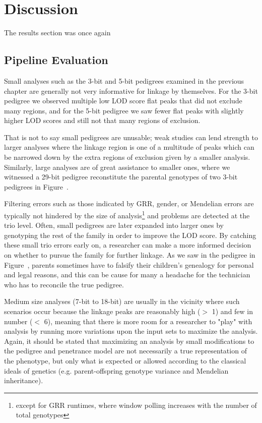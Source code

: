 \chapter{Discussion}

The results section was once again

\section{Pipeline Evaluation}

Small analyses such as the 3-bit and 5-bit pedigrees examined in the previous chapter are generally not very informative for linkage by themselves. For the 3-bit pedigree we observed multiple low LOD score flat peaks that did not exclude many regions, and for the 5-bit pedigree we saw fewer flat peaks with slightly higher LOD scores and still not that many regions of exclusion.

That is not to say small pedigrees are unusable; weak studies can lend strength to larger analyses where the linkage region is one of a multitude of peaks which can be narrowed down by the extra regions of exclusion given by a smaller analysis. Similarly, large analyses are of great assistance to smaller ones, where we witnessed a 29-bit pedigree reconstitute the parental genotypes of two 3-bit pedigrees in Figure~.

Filtering errors such as those indicated by GRR, gender, or Mendelian errors are typically not hindered by the size of analysis\footnote{except for GRR runtimes, where window polling increases with the number of total genotypes} and problems are detected at the trio level. Often, small pedigrees are later expanded into larger ones by genotyping the rest of the family in order to improve the LOD score. By catching these small trio errors early on, a researcher can make a more informed decision on whether to pursue the family for further linkage. As we saw in the pedigree in Figure~, parents sometimes have to falsify their children's genealogy for personal and legal reasons, and this can be cause for many a headache for the technician who has to reconcile the true pedigree.

Medium size analyses (7-bit to 18-bit) are usually in the vicinity where such scenarios occur because the linkage peaks are reasonably high ($>$ 1) and few in number ($<$ 6), meaning that there is more room for a researcher to "play" with analysis by running more variations upon the input sets to maximize the analysis. Again, it should be stated that maximizing an analysis by small modifications to the pedigree and penetrance model are not necessarily a true representation of the phenotype, but only what is expected or allowed according to the classical ideals of genetics (e.g. parent-offspring genotype variance and Mendelian inheritance).

